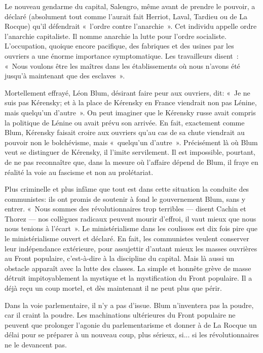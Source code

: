 \documentclass[french,twoside]{book} %
\begin{document}
Le nouveau gendarme du capital, Salengro, même avant de prendre le pouvoir, a déclaré (absolument tout comme l’aurait fait Herriot, Laval, Tardieu ou de La Rocque) qu’il défendrait « l’ordre contre l’anarchie ». Cet individu appelle ordre l’anarchie capitaliste. Il nomme anarchie la lutte pour l’ordre socialiste. L’occupation, quoique encore pacifique, des fabriques et des usines par les ouvriers a une énorme importance symptomatique. Les travailleurs disent : « Nous voulons être les maîtres dans les établissements où nous n’avons été jusqu’à maintenant que des esclaves ».\par
 Mortellement effrayé, Léon Blum, désirant faire peur aux ouvriers, dit: « Je ne suis pas Kérensky; et à la place de Kérensky en France viendrait non pas Lénine, mais quelqu’un d’autre ». On peut imaginer que le Kérensky russe avait compris la politique de Lénine ou avait prévu son arrivée. En fait, exactement comme Blum, Kérensky faisait croire aux ouvriers qu’au cas de sa chute viendrait au pouvoir non le bolchévisme, mais « quelqu’un d’autre ». Précisément là où Blum veut se distinguer de Kérensky, il l’imite servilement. Il est impossible, pourtant, de ne pas reconnaître que, dans la mesure où l’affaire dépend de Blum, il fraye en réalité la voie au fascisme et non au prolétariat.\par
Plus criminelle et plus infâme que tout est dans cette situation la conduite des communistes: ils ont promis de soutenir à fond le gouvernement Blum, sans y entrer. « Nous sommes des révolutionnaires trop terribles — disent Cachin et Thorez — nos collègues radicaux peuvent mourir d’effroi, il vaut mieux que nous nous tenions à l’écart ». Le ministérialisme dans les coulisses est dix fois pire que le ministérialisme ouvert et déclaré. En fait, les communistes veulent conserver leur indépendance extérieure, pour assujettir d’autant mieux les masses ouvrières au Front populaire, c’est-à-dire à la discipline du capital. Mais là aussi un obstacle apparaît avec la lutte des classes. La simple et honnête grève de masse détruit impitoyablement la mystique et la mystification du Front populaire. Il a déjà reçu un coup mortel, et dès maintenant il ne peut plus que périr.\par
Dans la voie parlementaire, il n’y a pas d’issue. Blum n’inventera pas la poudre, car il craint la poudre. Les machinations ultérieures du Front populaire ne peuvent que prolonger l’agonie du parlementarisme et donner à de La Rocque un délai pour se préparer à un nouveau coup,  plus sérieux, si... si les révolutionnaires ne le devancent pas.\par
\end{document}

